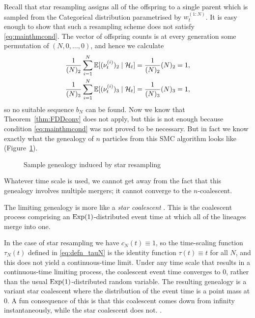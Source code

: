 Recall that star resampling assigns all of the offspring to a single parent which is sampled from the Categorical distribution parametrised by $w_t^{(1:N)}$.
It is easy enough to show that such a resampling scheme does not satisfy \eqref{eq:mainthmcond}.
The vector of offspring counts is at every generation some permutation of $(N,0,\dots,0)$, and hence we calculate
\begin{align*}
\frac{1}{(N)_2} \sum_{i=1}^N \mathbb{E}[ (\nu_t^{(i)})_2 \mid \mathcal{H}_t ]
&= \frac{1}{(N)_2} (N)_2 = 1 , \\
\frac{1}{(N)_3} \sum_{i=1}^N \mathbb{E}[ (\nu_t^{(i)})_3 \mid \mathcal{H}_t ]
&= \frac{1}{(N)_3} (N)_3 = 1 ,
\end{align*}
so no suitable sequence $b_N$ can be found.
Now we know that Theorem~\ref{thm:FDDconv} does not apply, but this is not enough because condition \eqref{eq:mainthmcond} was not proved to be necessary.
But in fact we know exactly what the genealogy of $n$ particles from this SMC algorithm looks like (Figure~\ref{fig:star_genealogy}).
\begin{figure}[ht]
\centering
{}
\caption{Sample genealogy induced by star resampling}
\label{fig:star_genealogy}
\end{figure}
Whatever time scale is used, we cannot get away from the fact that this genealogy involves multiple mergers; it cannot converge to the $n$-coalescent.

The limiting genealogy is more like a \emph{star coalescent} \parencite{pitman1999, griffiths2016}. This is the coalescent process comprising an $\operatorname{Exp}(1)$-distributed event time at which all of the lineages merge into one.

In the case of star resampling we have $c_N(t) \equiv 1$, so the time-scaling function $\tau_N(t)$ defined in \eqref{eq:defn_tauN} is the identity function $\tau(t) \equiv t$ for all $N$, and this does not yield a continuous-time limit.
Under any time scale that results in a continuous-time limiting process, the coalescent event time converges to $0$, rather than the usual $\operatorname{Exp}(1)$-distributed random variable. The resulting genealogy is a variant star coalescent where the distribution of the event time is a point mass at $0$. A fun consequence of this is that this coalescent comes down from infinity instantaneously, while the star coalescent does not. 
.





